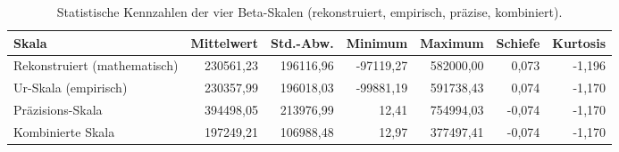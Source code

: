 \begin{table}[htbp]
\centering
\begin{tabular}{|l|r|r|r|r|r|r|}
\hline
\textbf{Skala} & \textbf{Mittelwert} & \textbf{Std.-Abw.} & \textbf{Minimum} & \textbf{Maximum} & \textbf{Schiefe} & \textbf{Kurtosis} \\
\hline
Rekonstruiert (mathematisch) & 230561{,}23 & 196116{,96} & -97119{,27} & 582000{,00} & 0{,}073 & -1{,}196 \\
Ur-Skala (empirisch)         & 230357{,99} & 196018{,03} & -99881{,19} & 591738{,43} & 0{,}074 & -1{,}170 \\
Präzisions-Skala             & 394498{,05} & 213976{,99} & 12{,}41     & 754994{,03} & -0{,}074 & -1{,}170 \\
Kombinierte Skala            & 197249{,21} & 106988{,48} & 12{,}97     & 377497{,41} & -0{,}074 & -1{,}170 \\
\hline
\end{tabular}
\caption{Statistische Kennzahlen der vier Beta-Skalen (rekonstruiert, empirisch, präzise, kombiniert).}
\label{tab:beta_skalen}
\end{table}